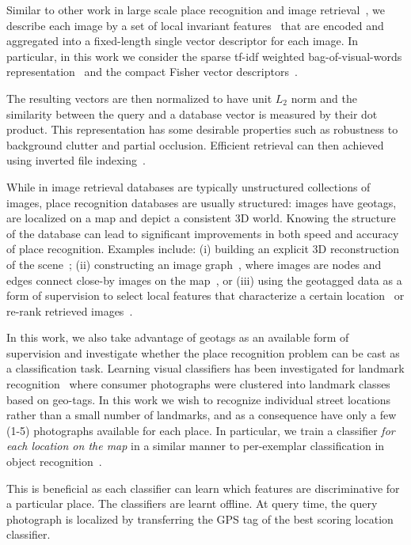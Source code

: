   Similar to other work in large scale place recognition \cite{Cummins09,Knopp2010,Schindler07,Torii2013} and image retrieval~\cite{Nister06,Philbin07,Sivic03,Jegou12}, we describe each image by a set of local invariant features~\cite{Bay06,Lowe04} that are encoded and aggregated into a fixed-length single vector descriptor for each image. In particular, in this work we consider the sparse tf-idf weighted bag-of-visual-words representation~\cite{Sivic03,Philbin07} and the compact Fisher vector descriptors~\cite{Jegou12}.  
  
  The resulting vectors are then normalized to have unit $L_2$ norm and the similarity between the query and a database vector is measured by their dot product. This representation has some desirable properties such as robustness to background clutter and partial occlusion. Efficient retrieval can then achieved using inverted file indexing~\cite{Jegou11}.


  While in image retrieval  databases are typically unstructured collections of images, place recognition databases are usually structured: images have geotags, are localized on a map and depict a consistent 3D world.
  Knowing the structure of the database can lead to significant improvements in both speed and accuracy of place recognition. 
  Examples include: (i) building an explicit 3D reconstruction of the scene~\cite{Irschara2009,Li10,Li12}; (ii) constructing an image graph~\cite{Cao13,Philbin10c,Turcot09}, where images are nodes and edges connect close-by images on the map~\cite{Torii11}, or (iii) using the geotagged data as a form of supervision to select local features that characterize a certain location~\cite{Knopp2010,Schindler07} or re-rank retrieved images~\cite{Zamir10}.

  In this work, we also take advantage of geotags as an available form of supervision and investigate whether the place recognition problem can be cast as a classification task.
  {
    Learning visual classifiers has been investigated for landmark recognition~\cite{Li09} where consumer photographs were clustered into landmark classes based on geo-tags. 
    In this work we wish to recognize individual street locations rather than a small number of landmarks, and as a consequence have only a few (1-5) photographs available for each place.  In particular, we train a classifier {\em for each location on the map} in a similar manner to per-exemplar classification in object recognition~\cite{Malisiewicz11}. 
  }


  This is beneficial as  each classifier can learn which features are discriminative for a particular place. The classifiers are learnt offline. At query time, the query photograph is localized by transferring the GPS tag of the best scoring location classifier.

